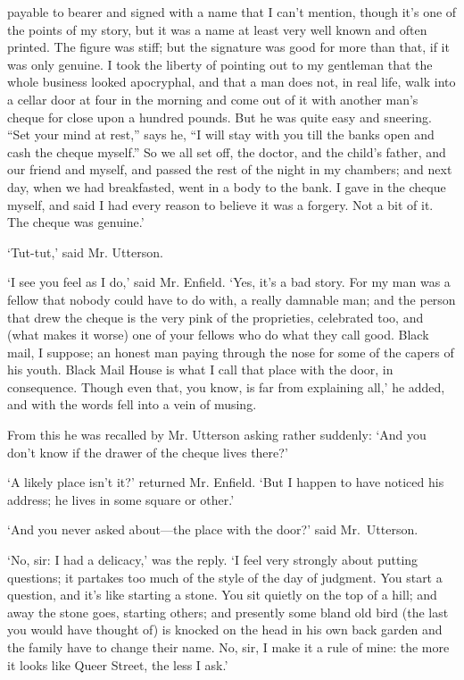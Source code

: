 \documentclass[]{novel}
\begin{document}
payable to bearer and signed with a name that I can’t mention, though it’s one of the points of my story, but it was a name at least very well known and often printed. The figure was stiff; but the signature was good for more than that, if it was only genuine. I took the liberty of pointing out to my gentleman that the whole business looked apocryphal, and that a man does not, in real life, walk into a cellar door at four in the morning and come out of it with another man’s cheque for close upon a hundred pounds. But he was quite easy and sneering. “Set your mind at rest,” says he, “I will stay with you till the banks open and cash the cheque myself.” So we all set off, the doctor, and the child’s father, and our friend and myself, and passed the rest of the night in my chambers; and next day, when we had breakfasted, went in a body to the bank. I gave in the cheque myself, and said I had every reason to believe it was a forgery. Not a bit of it. The cheque was genuine.’

‘Tut-tut,’ said Mr. Utterson.

‘I see you feel as I do,’ said Mr. Enfield. ‘Yes, it’s a bad story. For my man was a fellow that nobody could have to do with, a really damnable man; and the person that drew the cheque is the very pink of the proprieties, celebrated too, and (what makes it worse) one of your fellows who do what they call good. Black mail, I suppose; an honest man paying through the nose for some of the capers of his youth. Black Mail House is what I call that place with the door, in consequence. Though even that, you know, is far from explaining all,’ he added, and with the words fell into a vein of musing.

From this he was recalled by Mr. Utterson asking rather suddenly: ‘And you don’t know if the drawer of the cheque lives there?’

‘A likely place isn’t it?’ returned Mr. Enfield. ‘But I happen to have noticed his address; he lives in some square or other.’

‘And you never asked about—the place with the door?’ said Mr.~Utterson.

‘No, sir: I had a delicacy,’ was the reply. ‘I feel very strongly about putting questions; it partakes too much of the style of the day of judgment. You start a question, and it’s like starting a stone. You sit quietly on the top of a hill; and away the stone goes, starting others; and presently some bland old bird (the last you would have thought of) is knocked on the head in his own back garden and the family have to change their name. No, sir, I make it a rule of mine: the more it looks like Queer Street, the less I ask.’
\end{document}
